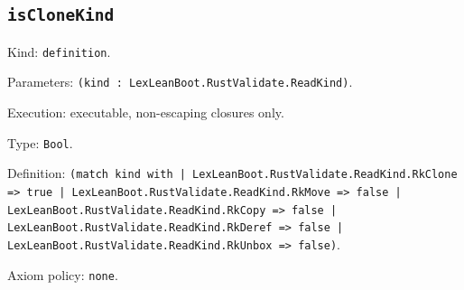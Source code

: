 \documentclass[11pt]{article}
\begin{document}
\subsection*{\texttt{isCloneKind}}
\noindent Kind: \texttt{definition}.\par
\noindent Parameters: \texttt{(kind : LexLeanBoot.RustValidate.ReadKind)}.\par
\noindent Execution: executable, non-escaping closures only.\par
\noindent Type: \texttt{Bool}.\par
\noindent Definition: \texttt{(match kind with | LexLeanBoot.RustValidate.ReadKind.RkClone => true | LexLeanBoot.RustValidate.ReadKind.RkMove => false | LexLeanBoot.RustValidate.ReadKind.RkCopy => false | LexLeanBoot.RustValidate.ReadKind.RkDeref => false | LexLeanBoot.RustValidate.ReadKind.RkUnbox => false)}.\par
\noindent Axiom policy: \texttt{none}.\par
\end{document}

